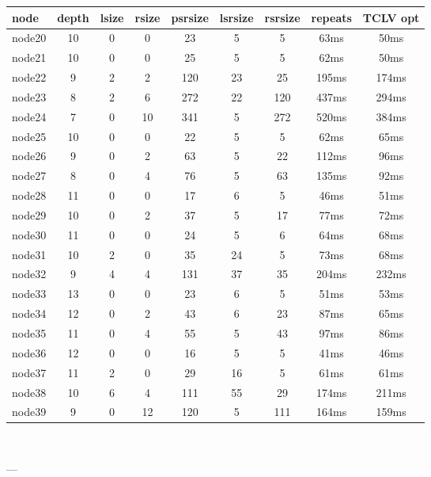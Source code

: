 \begin{tabular}{|l|c|c|c|c|c|c|c|c|}
\hline node & depth & lsize & rsize & psrsize & lsrsize & rsrsize   & repeats & TCLV opt\\
    \hline node20 & 10 & 0 & 0 & 23 & 5 & 5 & 63ms & 50ms\\
    \hline node21 & 10 & 0 & 0 & 25 & 5 & 5 & 62ms & 50ms\\
    \hline node22 & 9 & 2 & 2 & 120 & 23 & 25 & 195ms & 174ms\\
    \hline node23 & 8 & 2 & 6 & 272 & 22 & 120 & 437ms & 294ms\\
    \hline node24 & 7 & 0 & 10 & 341 & 5 & 272 & 520ms & 384ms\\
    \hline node25 & 10 & 0 & 0 & 22 & 5 & 5 & 62ms & 65ms\\
    \hline node26 & 9 & 0 & 2 & 63 & 5 & 22 & 112ms & 96ms\\
    \hline node27 & 8 & 0 & 4 & 76 & 5 & 63 & 135ms & 92ms\\
    \hline node28 & 11 & 0 & 0 & 17 & 6 & 5 & 46ms & 51ms\\
    \hline node29 & 10 & 0 & 2 & 37 & 5 & 17 & 77ms & 72ms\\
    \hline node30 & 11 & 0 & 0 & 24 & 5 & 6 & 64ms & 68ms\\
    \hline node31 & 10 & 2 & 0 & 35 & 24 & 5 & 73ms & 68ms\\
    \hline node32 & 9 & 4 & 4 & 131 & 37 & 35 & 204ms & 232ms\\
    \hline node33 & 13 & 0 & 0 & 23 & 6 & 5 & 51ms & 53ms\\
    \hline node34 & 12 & 0 & 2 & 43 & 6 & 23 & 87ms & 65ms\\
    \hline node35 & 11 & 0 & 4 & 55 & 5 & 43 & 97ms & 86ms\\
    \hline node36 & 12 & 0 & 0 & 16 & 5 & 5 & 41ms & 46ms\\
    \hline node37 & 11 & 2 & 0 & 29 & 16 & 5 & 61ms & 61ms\\
    \hline node38 & 10 & 6 & 4 & 111 & 55 & 29 & 174ms & 211ms\\
    \hline node39 & 9 & 0 & 12 & 120 & 5 & 111 & 164ms & 159ms\\

\hline
\end{tabular} \

---


